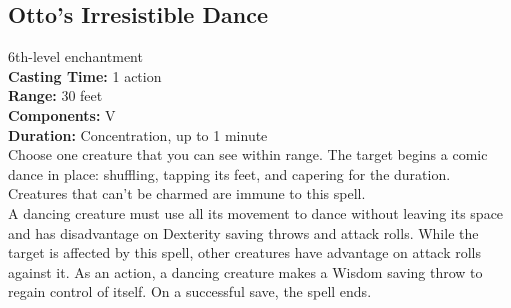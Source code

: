 \documentclass[11pt, A4paper, english]{article}
\begin{document}
		\subsection{Otto’s Irresistible Dance}
6th-level enchantment \\
\textbf{Casting Time:} 1 action \\
\textbf{Range:} 30 feet \\
\textbf{Components:} V \\
\textbf{Duration:} Concentration, up to 1 minute \\
Choose one creature that you can see within range. The target begins a comic dance in place: shuffling, tapping its feet, and capering for the duration. Creatures that can’t be charmed are immune to this spell. \\
A dancing creature must use all its movement to dance without leaving its space and has disadvantage on Dexterity saving throws and attack rolls. While the target is affected by this spell, other creatures have advantage on attack rolls against it. As an action, a dancing creature makes a Wisdom  saving throw to regain control of itself. On a successful save, the spell ends.
\end{document}
